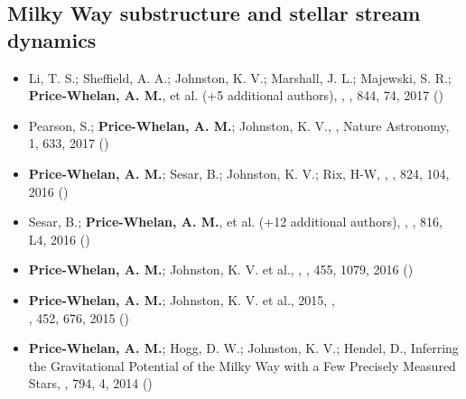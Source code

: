 \documentclass[12pt,letterpaper]{article}
\begin{document}
    \subsection*{Milky Way substructure and stellar stream dynamics}
    \begin{itemize}

\item Li, T. S.; Sheffield, A. A.; Johnston, K. V.; Marshall, J. L.; Majewski, S. R.; {\bf Price-Whelan, A. M.}, et al. (+5 additional authors),
    ,
    \apj, 844, 74, 2017 ()

\item Pearson, S.; {\bf Price-Whelan, A. M.}; Johnston, K. V.,
    ,
    Nature Astronomy, 1, 633, 2017 ()

\item {\bf Price-Whelan, A. M.}; Sesar, B.; Johnston, K. V.; Rix, H-W,
    ,
    \apj, 824, 104, 2016 ()

\item Sesar, B.; {\bf Price-Whelan, A. M.}, et al. (+12 additional authors),
    ,
    \apjl, 816, L4, 2016 ()

\item {\bf Price-Whelan, A. M.}; Johnston, K. V. et al.,
    ,
    \mnras, 455, 1079, 2016 ()

\item {\bf Price-Whelan, A. M.}; Johnston, K. V. et al., 2015,
    ,\\
    \mnras, 452, 676, 2015 ()

\item {\bf Price-Whelan, A. M.}; Hogg, D. W.; Johnston, K. V.; Hendel, D.,
    {Inferring the Gravitational Potential of the Milky Way with a Few Precisely Measured Stars},
    \apj, 794, 4, 2014 ()

    \end{itemize}
\end{document}
